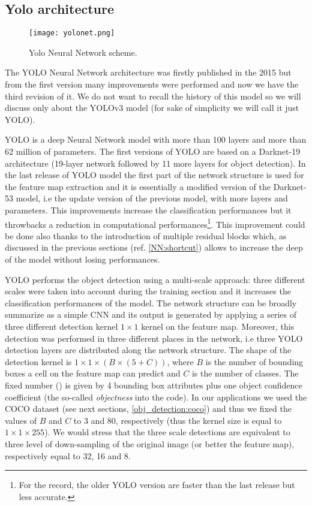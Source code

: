 \documentclass{standalone}
\begin{document}
\subsection[Yolo]{Yolo architecture}\label{obj_detection:yolo}

\begin{center}
\begin{figure}[htbp]
\centering
\texttt{[image: yolonet.png]}
\caption{Yolo Neural Network scheme.
}
\label{fig:yolo}
\end{figure}
\end{center}

The YOLO Neural Network architecture was firstly published in the 2015 but from the first version many improvements were performed and now we have the third revision of it.
We do not want to recall the history of this model so we will discuss only about the YOLOv3 model (for sake of simplicity we will call it just YOLO).

YOLO is a deep Neural Network model with more than 100 layers and more than 62 million of parameters.
The first versions of YOLO are based on a Darknet-19 architecture (19-layer network followed by 11 more layers for object detection).
In the last release of YOLO model the first part of the network structure is used for the feature map extraction and it is essentially a modified version of the Darknet-53 model, i.e the update version of the previous model, with more layers and parameters.
This improvements increase the classification performances but it throwbacks a reduction in computational performances\footnote{
  For the record, the older YOLO version are faster than the last release but less accurate.
}.
This improvement could be done also thanks to the introduction of multiple residual blocks which, as discussed in the previous sections (ref. \ref{NN:shortcut}) allows to increase the deep of the model without losing performances.

YOLO performs the object detection using a multi-scale approach: three different scales were taken into account during the training section and it increases the classification performances of the model.
The network structure can be broadly summarize as a simple CNN and its output is generated by applying a series of three different detection kernel $1\times1$ kernel on the feature map.
Moreover, this detection was performed in three different places in the network, i.e three YOLO detection layers are distributed along the network structure.
The shape of the detection kernel is $1\times1\times(B\times(5 + C))$, where $B$ is the number of bounding boxes a cell on the feature map can predict and $C$ is the number of classes.
The fixed number () is given by 4 bounding box attributes plus one object confidence coefficient (the so-called \emph{objectness} into the code).
In our applications we used the COCO dataset (see next sections, \ref{obj_detection:coco}) and thus we fixed the values of $B$ and $C$ to 3 and 80, respectively (thus the kernel size is equal to $1\times1\times255$).
We would stress that the three scale detections are equivalent to three level of down-sampling of the original image (or better the feature map), respectively equal to 32, 16 and 8.
\end{document}
